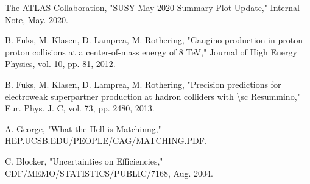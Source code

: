 \documentclass{article}
\begin{document}
\par \noindent
[12] The ATLAS Collaboration, "SUSY May 2020 Summary Plot Update," Internal Note, May. 2020. \\
\par \noindent
[13] B. Fuks, M. Klasen, D. Lamprea, M. Rothering, "Gaugino production in proton-proton collisions at a center-of-mass energy of 8 TeV," Journal of High Energy Physics, vol. 10, pp. 81, 2012. \\
\par \noindent
[14] B. Fuks, M. Klasen, D. Lamprea, M. Rothering, "Precision predictions for electroweak superpartner production at hadron colliders with {\textbackslash sc Resummino}," Eur. Phys. J. C, vol. 73, pp. 2480, 2013. \\
\par \noindent
[15] A. George, "What the Hell is Matchinng," HEP.UCSB.EDU/PEOPLE/CAG/MATCHING.PDF. \\
\par \noindent 
[16] C. Blocker, "Uncertainties on Efficiencies," CDF/MEMO/STATISTICS/PUBLIC/7168, Aug. 2004. \\
\end{document}
